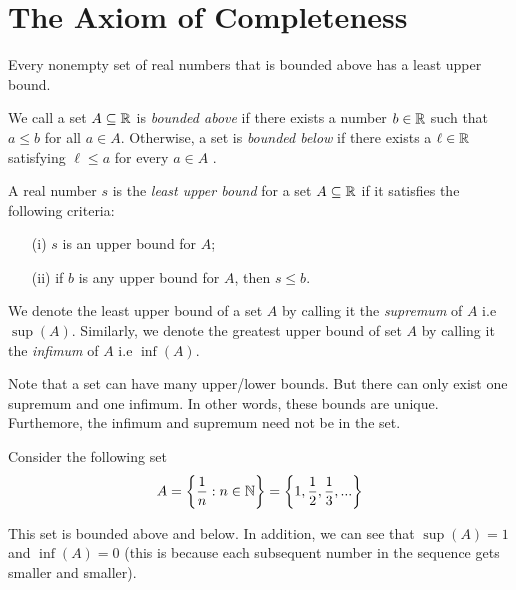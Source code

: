 

\section{The Axiom of Completeness}



\begin{theorem}
Every nonempty set of real numbers that is bounded above has a least upper bound.
\end{theorem}




\begin{definition}
        We call a set \( A \subseteq \mathbb{R} \) is \textit{bounded above} if there exists a number \( b \in \mathbb{R} \) such that \( a \leq b \) for all \( a \in A \).
        Otherwise, a set is \textit{bounded below} if there exists a \( \ell \in \mathbb{R} \) satisfying \( \ell \leq a \) for every \( a \in A \) .
\end{definition}






        A real number \( s \) is the \textit{least upper bound} for a set \( A \subseteq \mathbb{R} \) if it satisfies the following criteria:

        \begin{enumerate}
            \item[(i)] \( s \) is an upper bound for \( A \);
            \item[(ii)] if \( b \) is any upper bound for \( A \), then \( s \leq b \). 
        \end{enumerate}


        



We denote the least upper bound of a set \( A \) by calling it the \textit{supremum} of \( A \) i.e \( \sup(A) \). Similarly, we denote the greatest upper bound of set \( A \) by calling it the \textit{infimum} of \( A \) i.e \( \inf(A) \).

Note that a set can have many upper/lower bounds. But there can only exist one supremum and one infimum. In other words, these bounds are unique. Furthemore, the infimum and supremum need not be in the set.

Consider the following set
\[ A = \bigg\{ \frac{1}{n} : n \in \mathbb{N} \bigg\} = \bigg\{ 1,\frac{1}{2}, \frac{1}{3},... \bigg\}\]

This set is bounded above and below. In addition, we can see that \( \sup(A) = 1 \) and \( \inf(A) = 0 \) (this is because each subsequent number in the sequence gets smaller and smaller). 


